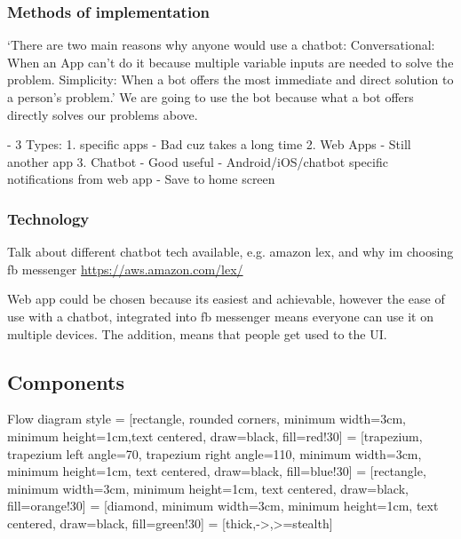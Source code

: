 \subsubsection*{Methods of implementation}
`There are two main reasons why anyone would use a chatbot:
Conversational: When an App can’t do it because multiple variable inputs are needed to solve the problem.
Simplicity: When a bot offers the most immediate and direct solution to a person’s problem.'
We are going to use the bot because what a bot offers directly solves our problems above.

- 3 Types:
  1. specific apps
    - Bad cuz takes a long time
  2. Web Apps
    - Still another app
  3. Chatbot
    - Good useful
- Android/iOS/chatbot specific notifications from web app
- Save to home screen

\subsubsection*{Technology}
Talk about different chatbot tech available, e.g. amazon lex, and why im choosing fb messenger
\url{https://aws.amazon.com/lex/}

Web app could be chosen because its easiest and achievable, however the ease of use with a chatbot, integrated into fb messenger means everyone can use it on multiple devices. The addition, means that people get used to the UI.

\subsection{Components}

Flow diagram style
 = [rectangle, rounded corners, minimum width=3cm, minimum height=1cm,text centered, draw=black, fill=red!30]
 = [trapezium, trapezium left angle=70, trapezium right angle=110, minimum width=3cm, minimum height=1cm, text centered, draw=black, fill=blue!30]
 = [rectangle, minimum width=3cm, minimum height=1cm, text centered, draw=black, fill=orange!30]
 = [diamond, minimum width=3cm, minimum height=1cm, text centered, draw=black, fill=green!30]
 = [thick,->,>=stealth]


